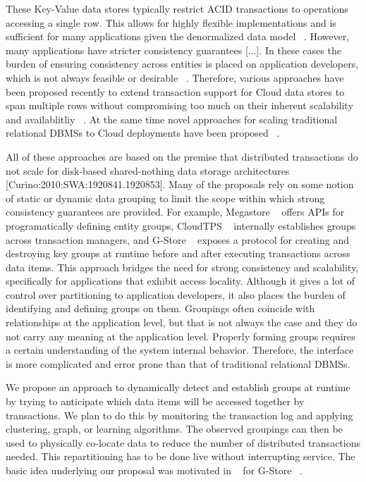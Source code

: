 \documentclass[10pt,final,journal]{IEEEtran}
\begin{document}
These Key-Value data stores typically restrict ACID transactions to operations accessing a single row.  This allows for highly flexible implementations and is sufficient for many applications given the denormalized data model ~\cite{Agrawal:2010}. However, many applications have stricter consistency guarantees [...]. In these cases the burden of ensuring consistency across entities is placed on application developers, which is not always feasible or desirable ~\cite{Bernstein:2011:AMS:2004686.2005651}. Therefore, various approaches have been proposed recently  to extend transaction support for Cloud data stores to span multiple rows without compromising too much on their inherent scalability and availablitliy ~\cite{Baker:2011:8530095, Das:2010:GSD:1807128.1807157, Junqueira:2011:LTS:2056318.2057148, Levandoski:2011:8530161, Zhou:2011:5740834, Peng:2010:LIP:1924943.1924961, Zhang:2010:5697970}. At the same time novel approaches for scaling traditional relational DBMSs to Cloud deployments have been proposed ~\cite{Bernstein:2011:AMS:2004686.2005651, Curino:2011:JPMWMBZ11}.

All of these approaches are based on the premise that distributed transactions do not scale for disk-based shared-nothing data storage architectures [Curino:2010:SWA:1920841.1920853]. Many of the proposals rely on some notion of static or dynamic data grouping to limit the scope within which strong consistency guarantees are provided. For example, Megastore ~\cite{Baker:2011:8530095} offers APIs for programatically defining entity groups, CloudTPS ~\cite{Zhou:2011:5740834} internally establishes groups across transaction managers, and G-Store ﻿~\cite{Das:2010:GSD:1807128.1807157} exposes a protocol for creating and destroying key groups at runtime before and after executing transactions across data items. This approach bridges the need for strong consistency and scalability, specifically for applications that exhibit access locality. Although it gives a lot of control over partitioning to application developers, it also places the burden of identifying and defining groups on them. Groupings often coincide with relationships at the application level, but that is not always the case and they do not carry any meaning at the application level. Properly forming groups requires a certain understanding of the system internal behavior. Therefore, the interface is more complicated and error prone than that of traditional relational DBMSs.

We propose an approach to dynamically detect and establish groups at runtime by trying to anticipate which data items will be accessed together by transactions. We plan to do this by monitoring the transaction log and applying clustering, graph, or learning algorithms. The observed groupings can then be used to physically co-locate data to reduce the number of distributed transactions needed. This repartitioning has to be done live without interrupting service. The basic idea underlying our proposal was motivated in ~\cite{Das:2011} for G-Store ﻿~\cite{Das:2010:GSD:1807128.1807157}.
\end{document}
